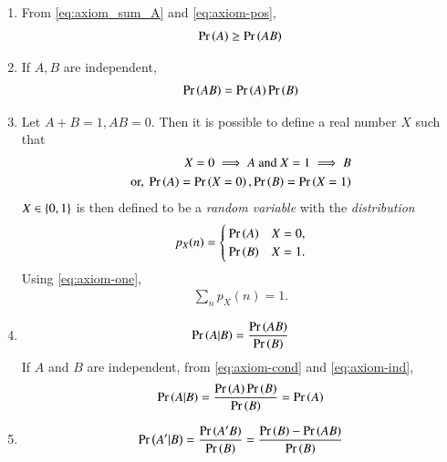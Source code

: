 \begin{enumerate}[label=\thesubsection.\arabic*,ref=\thesubsection.\theenumi]
\begin{proof}
\begin{align}
\label{eq:axiom_sum_ApB}
\end{align}
From 
\eqref{eq:axiom_sum_A}
and 
\eqref{eq:axiom_sum_ApB},
we obtain
\eqref{eq:axiom_sum_AB}.
		\end{proof}
	\item 
From \eqref{eq:axiom_sum_A}
and 
	\eqref{eq:axiom-pos},
\begin{align}
	\label{eq:axiom-prod-ge}
	\pr{A} \ge \pr{AB}
\end{align}
\item If $A, B$ are independent,
\begin{align}
	\pr{AB} = \pr{A}\pr{B}
\label{eq:axiom-ind}
\end{align}
\item Let $A + B = 1, AB = 0$.  Then it is possible to define a real number $X$ such that 
\begin{align}
	X = 0 \implies A \text{ and } X = 1 \implies B
	\\
	\text{or, }
	\Pr\left(A\right) = \Pr\left(X=0\right),
	\Pr\left(B\right) = \Pr\left(X=1\right)
\end{align}
$X \in \left\{0,1\right\}$ is then defined to be a {\em random variable} with the {\em distribution}
\begin{align}
	\label{eq:dist}
	p_X(n) = 
	\begin{cases}
		\pr{A} & X=0,
		\\
		\pr{B} & X=1.
\end{cases}
\end{align}
Using 
	\eqref{eq:axiom-one},
\begin{align}
	\sum_n p_X(n) = 1.
	\label{eq:dist-axiom-one}
\end{align}
\item 
\begin{align}
	\pr{A | B} = \frac{\pr{AB}}{\pr{B}}
\label{eq:axiom-cond}
\end{align}
If $A$ and $B$ are independent, from 
\eqref{eq:axiom-cond}
and 
\eqref{eq:axiom-ind},
\begin{align}
	\pr{A | B} = \frac{\pr{A}\pr{B}}{\pr{B}}={\pr{A}}
\label{eq:axiom-cond-ind}
\end{align}
\item 
\begin{align}
	\pr{A' | B} = \frac{\pr{A'B}}{\pr{B}} = \frac{\pr{B}-\pr{AB}}{\pr{B}}
\label{eq:axiom-cond-prime}
\end{align}
\end{enumerate}
